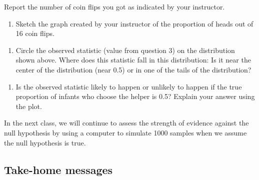 \documentclass[
]{report}
\providecommand{\tightlist}{%
  \setlength{\itemsep}{0pt}\setlength{\parskip}{0pt}}
\begin{document}
\vspace{0.2in}

Report the number of coin flips you got as indicated by your instructor.

\begin{enumerate}
\def\labelenumi{\arabic{enumi}.}
\setcounter{enumi}{12}
\tightlist
\item
  Sketch the graph created by your instructor of the proportion of heads out of 16 coin flips.
\end{enumerate}

\vspace{2in}

\begin{enumerate}
\def\labelenumi{\arabic{enumi}.}
\setcounter{enumi}{13}
\tightlist
\item
  Circle the observed statistic (value from question 3) on the distribution shown above. Where does this statistic fall in this distribution: Is it near the center of the distribution (near 0.5) or in one of the tails of the distribution?
\end{enumerate}

\vspace{0.2in}

\begin{enumerate}
\def\labelenumi{\arabic{enumi}.}
\setcounter{enumi}{14}
\tightlist
\item
  Is the observed statistic likely to happen or unlikely to happen if the true proportion of infants who choose the helper is 0.5? Explain your answer using the plot.
\end{enumerate}

\vspace{0.8in}

In the next class, we will continue to assess the strength of evidence against the null hypothesis by using a computer to simulate 1000 samples when we assume the null hypothesis is true.

\newpage

\subsection{Take-home messages}\label{take-home-messages-5}
\end{document}
